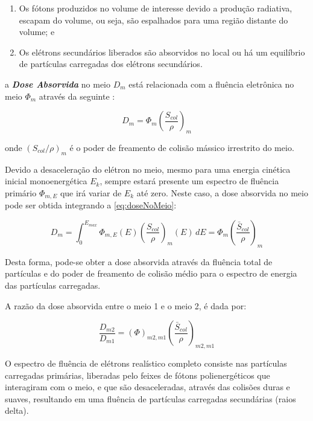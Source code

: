 \documentclass[11pt,a4paper]{article}
\begin{document}
		\begin{enumerate}
			\item Os fótons produzidos no volume de interesse devido a produção radiativa, escapam do volume, ou seja, são espalhados para uma região distante do volume; e
			\item Os elétrons secundários liberados são absorvidos no local ou há um equilíbrio de partículas carregadas dos elétrons secundários.
		\end{enumerate}

		\noindent a \textbf{\textit{\textcolor{CarnationPink}{Dose Absorvida}}} no meio $D_{m}$ está relacionada com a fluência eletrônica no meio $\Phi_{m}$ através da seguinte  :

			\begin{equation}
				D_m = \Phi_m \left(\frac{S_{col}}{\rho}\right)_m
				\label{eq:doseNoMeio}
			\end{equation}

		\noindent onde $(S_{col}/\rho)_m$ é o poder de freamento de colisão mássico irrestrito do meio.

		Devido a desaceleração do elétron no meio, mesmo para uma energia cinética inicial monoenergética $E_k$, sempre estará presente um espectro de fluência primário $\Phi_{m,E}$ que irá variar de $E_k$ até zero. Neste caso, a dose absorvida no meio pode ser obtida integrando a   \ref{eq:doseNoMeio}:

			\begin{equation}
				D_{m}= \int_{0}^{E_{max}} \Phi_{m, E}(E)\left(\frac{S_{col}}{\rho}\right)_{m}(E)  \,dE
				= \Phi_m \left(\frac{\bar{S}_{col}}{\rho}\right)_m
				\label{eq:doseAbsorvidaNoMeio}
			\end{equation}

		Desta forma, pode-se obter a dose absorvida através da fluência total de partículas e do poder de freamento de colisão médio para o espectro de energia das partículas carregadas. 

		A razão da dose absorvida entre o meio 1 e o meio 2, é dada por:

			\begin{equation}
				\frac{D_{m2}}{D_{m1}} = (\Phi)_{m2,m1} \left(\frac{\bar{S}_{col}}{\rho}\right)_{m2,m1}
			\end{equation}


		O espectro de fluência de elétrons realístico completo consiste nas partículas carregadas primárias, liberadas pelo feixes de fótons polienergéticos que interagiram com o meio, e que são desaceleradas, através das colisões duras e suaves, resultando em uma fluência de partículas carregadas secundárias (raios delta). 
		
\end{document}
